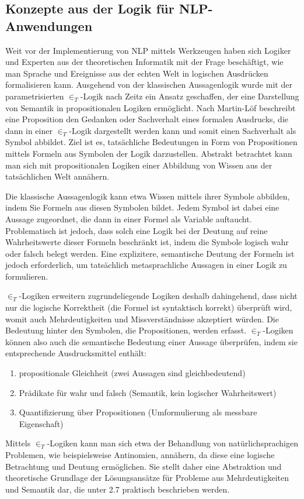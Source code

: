 \documentclass[12pt]{report}
\begin{document}
\subsection{Konzepte aus der Logik für NLP-Anwendungen}
Weit vor der Implementierung von NLP mittels Werkzeugen haben sich Logiker und Experten aus der theoretischen Informatik mit der Frage beschäftigt, wie man Sprache und Ereignisse aus der echten Welt in logischen Ausdrücken formalisieren kann. Ausgehend von der klassischen Aussagenlogik wurde mit der parametrisierten $\in_T$-Logik nach Zeitz \cite{ze00} ein Ansatz geschaffen, der eine Darstellung von Semantik in propositionalen Logiken ermöglicht. Nach Martin-Löf \cite{ml96} beschreibt eine Proposition den \glqq  Gedanken oder Sachverhalt eines formalen Ausdrucks\grqq{}, die dann in einer $\in_T$-Logik dargestellt werden kann und somit einen Sachverhalt als Symbol abbildet. Ziel ist es, tatsächliche Bedeutungen in Form von Propositionen mittels Formeln aus Symbolen der Logik darzustellen. Abstrakt betrachtet kann man sich mit propositionalen Logiken einer Abbildung von Wissen aus der tatsächlichen Welt annähern. 

Die klassische Aussagenlogik kann etwa Wissen mittels ihrer Symbole abbilden, indem Sie Formeln aus diesen Symbolen bildet. Jedem Symbol ist dabei eine Aussage zugeordnet, die dann in einer Formel als Variable auftaucht. Problematisch ist jedoch, dass solch eine Logik bei der Deutung auf reine Wahrheitswerte dieser Formeln beschränkt ist, indem die Symbole logisch wahr oder falsch belegt werden. Eine explizitere, semantische Deutung der Formeln ist jedoch erforderlich, um tatsächlich metasprachliche Aussagen in einer Logik zu formulieren. 

$\in_T$-Logiken erweitern zugrundeliegende Logiken deshalb dahingehend, dass nicht nur die logische Korrektheit (die Formel ist syntaktisch korrekt) überprüft wird, womit auch Mehrdeutigkeiten und Missverständnisse akzeptiert würden. Die Bedeutung hinter den Symbolen, die Propositionen, werden erfasst. $\in_T$-Logiken können also auch die semantische Bedeutung einer Aussage überprüfen, indem sie entsprechende Ausdrucksmittel enthält:
\begin{enumerate}
\item propositionale Gleichheit (zwei Aussagen sind gleichbedeutend)
\item Prädikate für wahr und falsch (Semantik, kein logischer Wahrheitswert)
\item Quantifizierung über Propositionen (Umformulierung als messbare Eigenschaft)
\end{enumerate}
Mittels $\in_T$-Logiken kann man sich etwa der Behandlung von natürlichsprachigen Problemen, wie beispielsweise Antinomien, annähern, da diese eine logische Betrachtung und Deutung ermöglichen. Sie stellt daher eine Abstraktion und theoretische Grundlage der Lösungsansätze für Probleme aus Mehrdeutigkeiten und Semantik dar, die unter 2.7 praktisch beschrieben werden.
\end{document}
